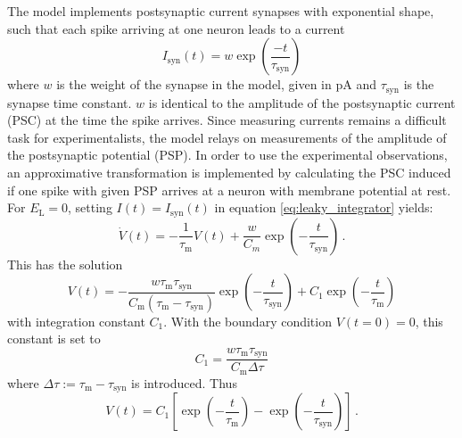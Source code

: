 The model implements  
postsynaptic current synapses with exponential shape, such that each 
spike arriving at one neuron leads to a current 
\begin{equation}
I_{\text{syn}}(t) = w \exp{\left(\frac{-t}{\tau_\text{syn}}\right)}	
    \label{eq:synaptic_current}
\end{equation}
where $w$ is the weight of the synapse in the model, given in pA
and $\tau_\text{syn}$ is the synapse time constant.
$w$ is identical to the amplitude of the postsynaptic 
current (PSC) at the time the spike arrives. 
Since measuring currents remains a difficult task for experimentalists, 
the model relays on measurements of the amplitude of the postsynaptic 
potential (PSP). In order to use the experimental observations, 
an approximative transformation is implemented 
by calculating the PSC induced if one spike with given PSP arrives at 
a neuron with membrane potential at rest. 
For $E_\text{L} = 0$, setting $I(t) = I_\text{syn}(t)$ in equation \eqref{eq:leaky_integrator}
yields:
\begin{equation}
    \dot{V}(t)
    = - \frac{1}{\tau_\text{m}} V(t) + \frac{w}{C_m} \exp{\left(-\frac{t}{\tau_\text{syn}}\right)} \,.
    \label{eq:psc_ode}
\end{equation}
This has the solution 
\begin{equation}
    V(t) =   
        - \frac{w \tau_\text{m} \tau_\text{syn}} {C_\text{m} \left(\tau_\text{m} - \tau_\text{syn}\right)}	
        \exp{\left( -\frac{t}{\tau_\text{syn}} \right)} 
        + C_1 \exp{\left(-\frac{t}{\tau_\text{m}} \right)}
    \label{eq:psc_ode_sol}
\end{equation}
with integration constant $C_1$.
With the boundary condition $V(t = 0) = 0$, this constant is set to
\begin{equation}
    C_1 = \frac{w \tau_\text{m} \tau_\text{syn}}{C_\text{m} \Delta\tau}	
    \label{eq:C_1}
\end{equation}
where $\Delta\tau := \tau_\text{m} - \tau_\text{syn}$ is introduced.
Thus
\begin{equation}
    V(t) = C_1 \left[\exp\left(-\frac{t}{\tau_\text{m}}\right) - \exp\left(-\frac{t}{\tau_\text{syn}}\right)\right]	\,.  
    \label{eq:V(t)}
\end{equation}

